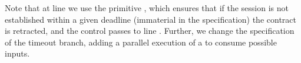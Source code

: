 Note that at line  we use the primitive ,
which ensures that if the session  is not established
within a given deadline (immaterial in the specification)
the contract  is retracted,
and the control passes to line .
Further, we change the specification of the timeout branch,
adding a parallel execution of a 
to consume possible inputs.




